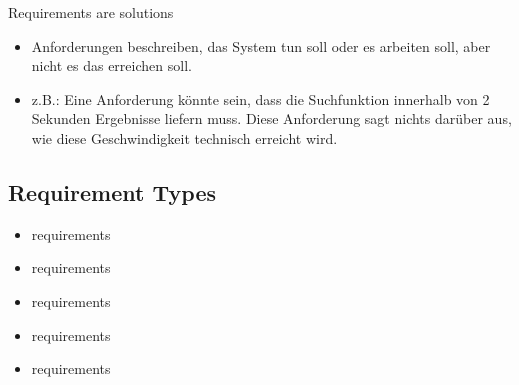 \begin{defBox}
	Requirements are  solutions
\end{defBox}
\begin{infoBox}
    \begin{itemize}
        \item Anforderungen beschreiben,  das System tun soll oder  es arbeiten soll, aber nicht  es das erreichen soll.
        \item z.B.: Eine Anforderung könnte sein, dass die Suchfunktion innerhalb von 2 Sekunden Ergebnisse liefern muss. Diese Anforderung sagt nichts darüber aus, wie diese Geschwindigkeit technisch erreicht wird.
    \end{itemize}
\end{infoBox}
\subsection{Requirement Types}
\begin{defBox}[title=Many Different Types of Requirements]
	\begin{itemize}
		\item {} requirements
		\item {} requirements
		\item {} requirements
		\item {} requirements
		\item {} requirements
	\end{itemize}
\end{defBox}

